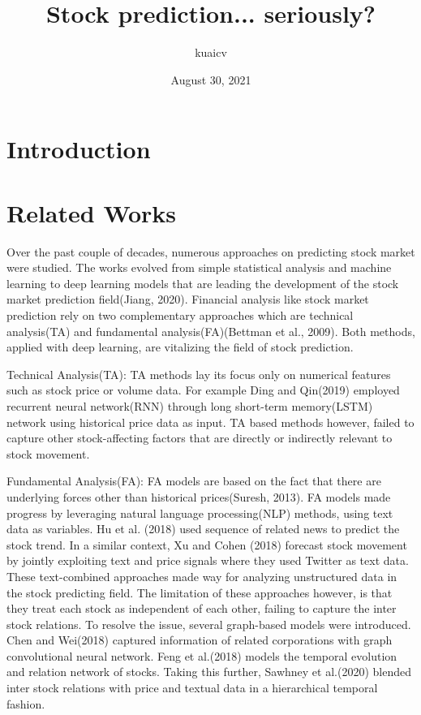 \documentclass[11pt, oneside, twocolumn]{article}   	%
\title{Stock prediction... seriously?}
\author{kuaicv}
\date{August 30, 2021}
\renewenvironment{abstract}
{\small
\begin{center}
\bfseries \abstractname\vspace{-.5em}\vspace{0pt}
\end{center}
\list{}{
	\setlength{\leftmargin}{.4cm}
	\setlength{\rightmargin}{\leftmargin}
}
\item\relax}
{\endlist}
\begin{document}
\maketitle


\begin{abstract}
	\blindtext
\end{abstract}

\section{Introduction}
\section{Related Works}
Over the past couple of decades, numerous approaches on predicting stock market were studied. The works evolved from simple statistical analysis and machine learning to deep learning models that are leading the development of the stock market prediction field(Jiang, 2020). Financial analysis like stock market prediction rely on two complementary approaches which are technical analysis(TA) and fundamental analysis(FA)(Bettman et al., 2009). Both methods, applied with deep learning, are vitalizing the field of stock prediction.

Technical Analysis(TA): TA methods lay its focus only on numerical features such as stock price or volume data. For example Ding and Qin(2019) employed recurrent neural network(RNN) through long short-term memory(LSTM) network using historical price data as input. TA based methods however, failed to capture other stock-affecting factors that are directly or indirectly relevant to stock movement. 

Fundamental Analysis(FA): FA models are based on the fact that there are underlying forces other than historical prices(Suresh, 2013). FA models made progress by leveraging natural language processing(NLP) methods, using text data as variables. Hu et al. (2018) used sequence of related news to predict the stock trend. In a similar context, Xu and Cohen (2018) forecast stock movement by jointly exploiting text and price signals where they used Twitter as text data. These text-combined approaches made way for analyzing unstructured data in the stock predicting field. The limitation of these approaches however, is that they treat each stock as independent of each other, failing to capture the inter stock relations. To resolve the issue, several graph-based models were introduced. Chen and Wei(2018) captured information of related corporations with graph convolutional neural network. Feng et al.(2018) models the temporal evolution and relation network of stocks. Taking this further, Sawhney et al.(2020) blended inter stock relations with price and textual data in a hierarchical temporal fashion. 
\end{document}
